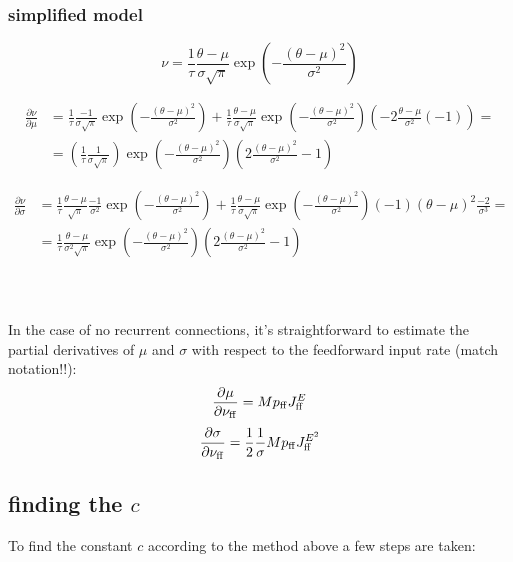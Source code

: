 \subsubsection{simplified model}

\[ 
\nu = \frac{1}{\tau} \frac{\theta - \mu}{\sigma \sqrt{\pi}} \exp \left(- {\frac{(\theta - \mu)^2}{\sigma^2}} \right)
\]

\begin{align}
 \frac{\partial \nu}{\partial \mu} &= 
 \frac{1}{\tau} \frac{-1}{\sigma \sqrt{\pi}} \exp \left(-{\frac{(\theta - \mu)^2}{\sigma^2}} \right) +
 \frac{1}{\tau} \frac{\theta - \mu}{\sigma \sqrt{\pi}} \exp \left(-{\frac{(\theta - \mu)^2}{\sigma^2}} \right) \left(-2\frac{\theta - \mu}{\sigma^2}(-1)\right) = \\
 &= (\frac{1}{\tau} \frac{1}{\sigma \sqrt{\pi}})  \exp \left(-{\frac{(\theta - \mu)^2}{\sigma^2}} \right) \left( 2\frac{(\theta - \mu)^2}{\sigma^2} - 1 \right)
\end{align}


\begin{align}
 \frac{\partial \nu}{\partial \sigma} &= 
 \frac{1}{\tau} \frac{\theta - \mu}{\sqrt{\pi}} \frac{-1}{\sigma^2} \exp \left(-{\frac{(\theta - \mu)^2}{\sigma^2}} \right) +
 \frac{1}{\tau} \frac{\theta - \mu}{\sigma \sqrt{\pi}} \exp\left(-{\frac{(\theta - \mu)^2}{\sigma^2}} \right) (-1)(\theta - \mu)^2 \frac{-2}{\sigma^3} = \\
 &= \frac{1}{\tau} \frac{\theta - \mu}{\sigma^2 \sqrt{\pi}} \exp\left(-{\frac{(\theta - \mu)^2}{\sigma^2}} \right) \left(2 \frac{(\theta - \mu)^2}{\sigma^2} - 1 \right)
\end{align} \\\\\\


In the case of no recurrent connections, it's straightforward to estimate the partial derivatives of $\mu$ and $\sigma$ with respect to the feedforward input rate (match notation!!):
\[
  \frac{\partial \mu}{\partial \nu_{\rm ff}} = M p_{\rm ff} J_{\rm ff}^E 
\]
\[
  \frac{\partial \sigma}{\partial \nu_{\rm ff}} = \frac{1}{2} \frac{1}{\sigma} M p_{\rm ff} J_{\rm ff}^{E^2}
\]

\subsection{finding the $c$}
To find the constant $c$ according to the method above a few steps are taken:

